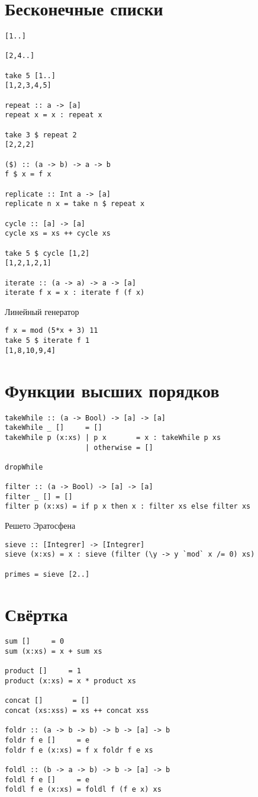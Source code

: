 \documentclass[a4paper,10pt]{article}
\begin{document}
\section{Бесконечные списки}
\begin{lstlisting}
[1..]

[2,4..]

take 5 [1..]
[1,2,3,4,5]

repeat :: a -> [a]
repeat x = x : repeat x

take 3 $ repeat 2
[2,2,2]

($) :: (a -> b) -> a -> b
f $ x = f x

replicate :: Int a -> [a]
replicate n x = take n $ repeat x

cycle :: [a] -> [a]
cycle xs = xs ++ cycle xs

take 5 $ cycle [1,2]
[1,2,1,2,1]

iterate :: (a -> a) -> a -> [a]
iterate f x = x : iterate f (f x)
\end{lstlisting}

Линейный генератор 
\begin{lstlisting}
f x = mod (5*x + 3) 11
take 5 $ iterate f 1
[1,8,10,9,4]
\end{lstlisting}

\section{Функции высших порядков}

\begin{lstlisting}
takeWhile :: (a -> Bool) -> [a] -> [a]
takeWhile _ []     = []
takeWhile p (x:xs) | p x       = x : takeWhile p xs
                   | otherwise = []

dropWhile

filter :: (a -> Bool) -> [a] -> [a]
filter _ [] = []
filter p (x:xs) = if p x then x : filter xs else filter xs
\end{lstlisting}

Решето Эратосфена

\begin{lstlisting}
sieve :: [Integrer] -> [Integrer]
sieve (x:xs) = x : sieve (filter (\y -> y `mod` x /= 0) xs)

primes = sieve [2..]
\end{lstlisting}

\section{Свёртка}

\begin{lstlisting}
sum []     = 0
sum (x:xs) = x + sum xs

product []     = 1
product (x:xs) = x * product xs

concat []       = []
concat (xs:xss) = xs ++ concat xss

foldr :: (a -> b -> b) -> b -> [a] -> b
foldr f e []     = e
foldr f e (x:xs) = f x foldr f e xs

foldl :: (b -> a -> b) -> b -> [a] -> b
foldl f e []     = e
foldl f e (x:xs) = foldl f (f e x) xs
\end{lstlisting}
\end{document}
